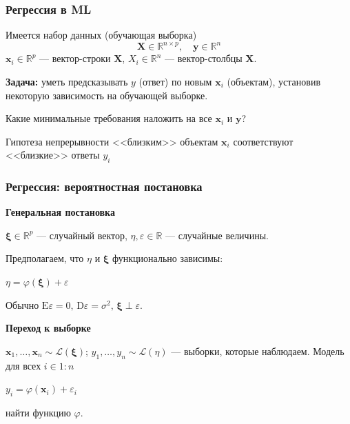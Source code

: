 \documentclass[ucs, notheorems, handout]{beamer}
\newcommand{\E}{\mathrm{E}}
\newcommand{\D}{\mathrm{D}}
\newcommand{\X}{\bm{X}}
\begin{document}
\begin{frame}
    \frametitle{Регрессия в ML}


Имеется набор данных (обучающая выборка)
$$
\X \in \mathbb{R}^{n\times p}, \quad \bm y \in \mathbb R^n
$$ 
\vspace{0.5cm}   
$\mathbf x_i \in \mathbb R^p$ --- вектор-строки $\X$, $X_i \in \mathbb R^n$ --- вектор-столбцы $\X$.

\textbf{Задача:} уметь предсказывать $y$ (ответ) по новым $\mathbf x_i$ (объектам), установив некоторую зависимость на обучающей выборке.
\vspace{0.5cm}  

Какие минимальные требования наложить на все $\mathbf x_i$ и $\bm y$?
\begin{block}{Гипотеза непрерывности}
\centering
<<близким>> объектам $\mathbf x_i$ соответствуют  <<близкие>> ответы $y_i$
\end{block}
 
\end{frame}


\begin{frame}
    \frametitle{Регрессия: вероятностная постановка}
    \vspace*{-5mm}
\begin{center}
	\textbf{Генеральная постановка}
\end{center}

$\bm \xi \in \mathbb R^p$ --- случайный вектор, $\eta, \varepsilon \in \mathbb R$ --- случайные величины.

Предполагаем, что $\eta$ и $\bm \xi$ функционально зависимы:
\begin{block}{}
\centering
$\eta = \varphi(\bm \xi) + \varepsilon$
\end{block}
Обычно $\E \varepsilon = 0, \, \D \varepsilon = \sigma^2,\, \bm\xi \perp \varepsilon. $
\begin{center}
\textbf{Переход к выборке}
\end{center}
$\mathbf x_1, \ldots, \mathbf x_n \sim \mathcal L(\bm \xi)$; $y_1, \ldots, y_n \sim \mathcal L(\eta)$ --- выборки, которые наблюдаем.
Модель для всех $i \in 1:n$ 
\begin{block}{}
\centering
$y_i = \varphi(\mathbf x_i) + \varepsilon_i$
\end{block}

\textbf{{\color{blue}{Задача:}}} найти функцию $\varphi$.

    
\end{frame}
\end{document}
